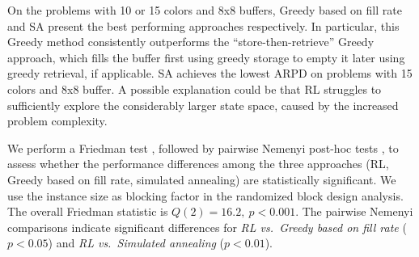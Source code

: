 \documentclass[11pt]{elsarticle}
\newcommand{\blackversion}{ }
\newcommand{\blackorcolor}{
\ifdefined\blackversion
	\color{black}
\fi
}
\newcommand{\REV}[1]{{\color{myblue}\blackorcolor #1}}
\begin{document}
\REV{On the problems with 10 or 15 colors and 8x8 buffers, Greedy based on fill rate and SA present the best performing approaches respectively. In particular, this Greedy method consistently outperforms the ``store-then-retrieve''  Greedy approach, which fills the buffer first using greedy storage to empty it later using greedy retrieval, if applicable. SA achieves the lowest ARPD on problems with 15 colors and 8x8 buffer. 
A possible explanation could be that RL struggles to sufficiently explore the considerably larger state space, caused by the increased problem complexity.

We perform a Friedman test \citep{Friedman.1937}, followed by pairwise Nemenyi post-hoc tests \citep{Nemenyi.1963}, to assess whether the performance differences among the three approaches (RL, Greedy based on fill rate, simulated annealing)  are statistically significant. We use the instance size as blocking factor in the randomized block design analysis. The overall Friedman statistic is $Q(2) = 16.2,\ p < 0.001$. The pairwise Nemenyi comparisons indicate significant differences for \emph{RL vs.\ Greedy based on fill rate} ($p < 0.05$) and \emph{RL vs.\ Simulated annealing} ($p < 0.01$).

}




\end{document}
